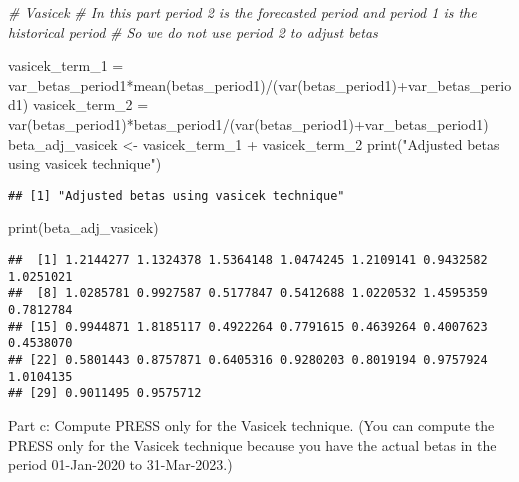 \documentclass[
]{article}
\newenvironment{Shaded}{\begin{snugshade}}{\end{snugshade}}
\newcommand{\CommentTok}[1]{\textcolor[rgb]{0.56,0.35,0.01}{\textit{#1}}}
\newcommand{\FunctionTok}[1]{\textcolor[rgb]{0.00,0.00,0.00}{#1}}
\newcommand{\NormalTok}[1]{#1}
\newcommand{\OtherTok}[1]{\textcolor[rgb]{0.56,0.35,0.01}{#1}}
\newcommand{\SpecialCharTok}[1]{\textcolor[rgb]{0.00,0.00,0.00}{#1}}
\newcommand{\StringTok}[1]{\textcolor[rgb]{0.31,0.60,0.02}{#1}}
\begin{document}
\begin{Shaded}
\begin{Highlighting}[]
\CommentTok{\# Vasicek}
\CommentTok{\# In this part period 2 is the forecasted period and period 1 is the historical period}
\CommentTok{\# So we do not use period 2 to adjust betas}


\NormalTok{vasicek\_term\_1 }\OtherTok{=}\NormalTok{ var\_betas\_period1}\SpecialCharTok{*}\FunctionTok{mean}\NormalTok{(betas\_period1)}\SpecialCharTok{/}\NormalTok{(}\FunctionTok{var}\NormalTok{(betas\_period1)}\SpecialCharTok{+}\NormalTok{var\_betas\_period1)}
\NormalTok{vasicek\_term\_2 }\OtherTok{=} \FunctionTok{var}\NormalTok{(betas\_period1)}\SpecialCharTok{*}\NormalTok{betas\_period1}\SpecialCharTok{/}\NormalTok{(}\FunctionTok{var}\NormalTok{(betas\_period1)}\SpecialCharTok{+}\NormalTok{var\_betas\_period1)}
\NormalTok{beta\_adj\_vasicek }\OtherTok{\textless{}{-}}\NormalTok{ vasicek\_term\_1 }\SpecialCharTok{+}\NormalTok{ vasicek\_term\_2}
\FunctionTok{print}\NormalTok{(}\StringTok{"Adjusted betas using vasicek technique"}\NormalTok{)}
\end{Highlighting}
\end{Shaded}

\begin{verbatim}
## [1] "Adjusted betas using vasicek technique"
\end{verbatim}

\begin{Shaded}
\begin{Highlighting}[]
\FunctionTok{print}\NormalTok{(beta\_adj\_vasicek)}
\end{Highlighting}
\end{Shaded}

\begin{verbatim}
##  [1] 1.2144277 1.1324378 1.5364148 1.0474245 1.2109141 0.9432582 1.0251021
##  [8] 1.0285781 0.9927587 0.5177847 0.5412688 1.0220532 1.4595359 0.7812784
## [15] 0.9944871 1.8185117 0.4922264 0.7791615 0.4639264 0.4007623 0.4538070
## [22] 0.5801443 0.8757871 0.6405316 0.9280203 0.8019194 0.9757924 1.0104135
## [29] 0.9011495 0.9575712
\end{verbatim}

Part c: Compute PRESS only for the Vasicek technique. (You can compute
the PRESS only for the Vasicek technique because you have the actual
betas in the period 01-Jan-2020 to 31-Mar-2023.)
\end{document}

